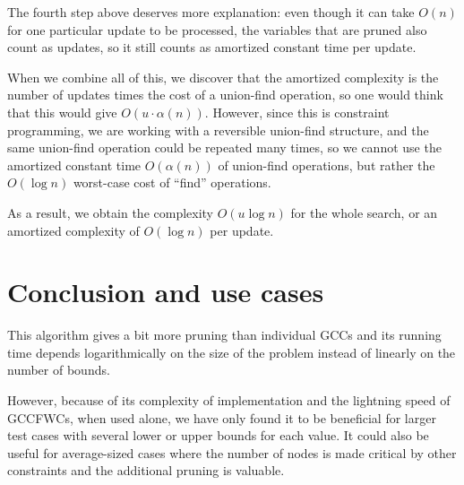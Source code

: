 \documentclass[a4paper,10pt]{article}
\begin{document}
The fourth step above deserves more explanation: even though it can take $O(n)$ for one particular update to be processed, the variables that are pruned also count as updates, so it still counts as amortized constant time per update.

When we combine all of this, we discover that the amortized complexity is the number of updates times the cost of a union-find operation, so one would think that this would give $O(u\cdot\alpha(n))$. However, since this is constraint programming, we are working with a reversible union-find structure, and the same union-find operation could be repeated many times, so we cannot use the amortized constant time $O(\alpha(n))$ of union-find operations, but rather the $O(\log n)$ worst-case cost of ``find'' operations.

As a result, we obtain the complexity $O(u \log n)$ for the whole search, or an amortized complexity of $O(\log n)$ per update.

\section{Conclusion and use cases}

This algorithm gives a bit more pruning than individual GCCs and its running time depends logarithmically on the size of the problem instead of linearly on the number of bounds.

However, because of its complexity of implementation and the lightning speed of GCCFWCs, when used alone, we have only found it to be beneficial for larger test cases with several lower or upper bounds for each value. It could also be useful for average-sized cases where the number of nodes is made critical by other constraints and the additional pruning is valuable.
\end{document}
